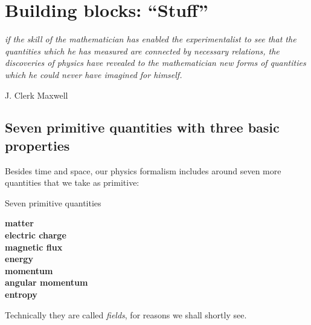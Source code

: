 \documentclass[a4paper,12pt,%
onecolumn,oneside,titlepage,%
british%
]{memoir}
\renewcommand*{\|}[1][]{\nonscript\:#1\vert\nonscript\:\mathopen{}}
\begin{document}
% 
% 
% 
% 





\printpagenotes*
\clearpage
\chapter{Building blocks: \enquote{Stuff}}
\label{cha:stuff}


\epigraph{\emph{if the skill of the mathematician has enabled the experimentalist to see that the quantities which he has measured are connected by necessary relations, the discoveries of physics have revealed to the mathematician new forms of quantities which he could never have imagined for himself.}}{J. Clerk Maxwell \cites*{maxwell1870}}


\section{Seven primitive quantities with three basic properties}
\label{sec:stuff}

Besides time and space, our physics formalism includes around seven more quantities that we take as primitive:
\begin{definition}{Seven primitive quantities}
  \begin{center}\bfseries
    matter
    \\ electric charge
    \\ magnetic flux
    \\ energy
    \\ momentum
    \\ angular momentum
    \\ entropy
  \end{center}
\end{definition}
Technically they are called \emph{fields}, for reasons we shall shortly see.
\end{document}
